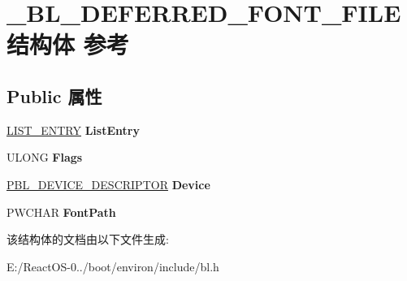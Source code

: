 \hypertarget{struct___b_l___d_e_f_e_r_r_e_d___f_o_n_t___f_i_l_e}{}\section{\+\_\+\+B\+L\+\_\+\+D\+E\+F\+E\+R\+R\+E\+D\+\_\+\+F\+O\+N\+T\+\_\+\+F\+I\+L\+E结构体 参考}
\label{struct___b_l___d_e_f_e_r_r_e_d___f_o_n_t___f_i_l_e}
\subsection*{Public 属性}
\begin{DoxyCompactItemize}
\item 
\mbox{\label{struct___b_l___d_e_f_e_r_r_e_d___f_o_n_t___f_i_l_e_af39e4c14bd9ce8060cddccaae5c71447}} 
\hyperlink{struct___l_i_s_t___e_n_t_r_y}{L\+I\+S\+T\+\_\+\+E\+N\+T\+RY} {\bfseries List\+Entry}
\item 
\mbox{\label{struct___b_l___d_e_f_e_r_r_e_d___f_o_n_t___f_i_l_e_a651fc8c5832de8867fea28b79cfcddfa}} 
U\+L\+O\+NG {\bfseries Flags}
\item 
\mbox{\label{struct___b_l___d_e_f_e_r_r_e_d___f_o_n_t___f_i_l_e_a107d952f2a7862c9c65f76fc3474f9ac}} 
\hyperlink{struct___b_l___d_e_v_i_c_e___d_e_s_c_r_i_p_t_o_r}{P\+B\+L\+\_\+\+D\+E\+V\+I\+C\+E\+\_\+\+D\+E\+S\+C\+R\+I\+P\+T\+OR} {\bfseries Device}
\item 
\mbox{\label{struct___b_l___d_e_f_e_r_r_e_d___f_o_n_t___f_i_l_e_a28582d084a7facedb848ceaf6988f488}} 
P\+W\+C\+H\+AR {\bfseries Font\+Path}
\end{DoxyCompactItemize}


该结构体的文档由以下文件生成\+:\begin{DoxyCompactItemize}
\item 
E\+:/\+React\+O\+S-\/0../boot/environ/include/bl.\+h\end{DoxyCompactItemize}
